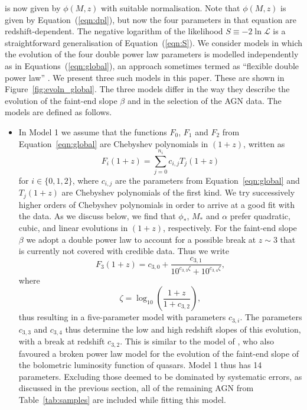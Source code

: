 \documentclass[fleqn,usenatbib]{mnras}
\begin{document}
is now given by $\phi(M,z)$ with suitable normalisation.  Note that
$\phi(M,z)$ is given by Equation~(\ref{eqn:dpl}), but now the four
parameters in that equation are redshift-dependent.  The negative
logarithm of the likelihood $S\equiv -2\ln\mathcal{L}$ is a
straightforward generalisation of Equation~(\ref{eqn:S}).  We consider
models in which the evolution of the four double power law parameters
is modelled independently as in Equations~(\ref{eqn:global}), an
approach sometimes termed as ``flexible double power law''
\citep{2015MNRAS.451.1892A}.  We present three such models in this
paper.  These are shown in Figure~\ref{fig:evoln_global}.  The three
models differ in the way they describe the evolution of the faint-end
slope $\beta$ and in the selection of the AGN data.  The models are
defined as follows.

\begin{itemize}

\item
  In Model 1 we assume that the functions $F_0$, $F_1$ and $F_2$ from
  Equation~\eqref{eqn:global} are Chebyshev polynomials in
  $\left(1+z\right)$, written as
  \begin{equation}
    F_i\left(1+z\right)=\sum_{j=0}^{n_i}c_{i,j}T_j\left(1+z\right)
    \label{eqn:cbs}
  \end{equation}
  for $i\in\{0,1,2\}$, where $c_{i,j}$ are the parameters from
  Equation~\eqref{eqn:global} and $T_j\left(1+z\right)$ are Chebyshev
  polynomials of the first kind. We try successively higher orders of
  Chebyshev polynomials in order to arrive at a good fit with the
  data.  As we discuss below, we find that $\phi_*$, $M_*$ and
  $\alpha$ prefer quadratic, cubic, and linear evolutions in
  $\left(1+z\right)$, respectively.  For the faint-end slope $\beta$
  we adopt a double power law to account for a possible break at
  $z\sim 3$ that is currently not covered with credible data.  Thus we
  write
  \begin{equation}
    F_3\left(1+z\right)=c_{3,0}+\frac{c_{3,1}}{10^{c_{3,3}\zeta}+10^{c_{3,4}\zeta}},
    \label{eqn:beta}
  \end{equation}
  where
  \begin{equation}
    \zeta = \log_{10}\left(\frac{1+z}{1+c_{3,2}}\right),
  \end{equation}
  thus resulting in a five-parameter model with parameters $c_{3,i}$.
  The parameters $c_{3,3}$ and $c_{3,4}$ thus determine the low and
  high redshift slopes of this evolution, with a break at redshift
  $c_{3,2}$.  This is similar to the model of
  \citet{2007ApJ...654..731H}, who also favoured a broken power law
  model for the evolution of the faint-end slope of the bolometric
  luminosity function of quasars.  Model 1 thus has 14 parameters.
  Excluding those deemed to be dominated by systematic errors, as
  discussed in the previous section, all of the remaining AGN from
  Table~\ref{tab:samples} are included while fitting this model.


\end{itemize}
\end{document}
